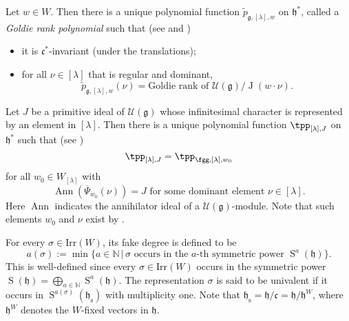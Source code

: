 \documentclass[12pt,a4paper]{amsart}
\newcommand{\BN}{{\mathbb {N}}}
\newcommand{\CU}{{\mathcal {U}}}
\DeclareMathOperator{\Ann}{Ann}
\newcommand{\oJ}{\operatorname{J}}
\newcommand{\oS}{\operatorname{S}}
\newcommand{\g}{\mathfrak g}
\newcommand{\h}{\mathfrak h}
\renewcommand{\c}{\mathfrak c}
\newcommand{\be}{\begin {equation}}
\newcommand{\ee}{\end {equation}}
\numberwithin{equation}{section}
\theoremstyle{remark}
\def\Irr{\mathrm{Irr}}
\newcommand{\Lam}{{[\lambda]}}
\begin{document}
Let $w\in W$. %
Then there is a unique
polynomial function $\tilde p_{\g,\Lam,w}$ on $\h^*$, called a \emph{Goldie rank polynomial} such that (see \cite[Section 5.12]{J1} and \cite[Section 2.10]{J.av})
\begin{itemize}
\item it is $\c^*$-invariant (under the translations);
\item for all $\nu\in \Lam$ that is regular and dominant,
\[
 \tilde p_{\g,\Lam,w}(\nu)=\textrm{Goldie rank of } \CU(\g)/\oJ(w \cdot\nu).
\]

\end{itemize}


Let $J$ be a primitive ideal of $\CU(\g)$ whose infinitesimal character is represented by an element in $\Lam$.
Then there is a unique polynomial function $ \tpp_{\Lam, J}$ on $\h^*$ such that (see \cite[Section 5.12]{J1})
\[
  \tpp_{\Lam, J}= \tpp_{\fgg,\Lam,w_0}
\]
for all $w_0\in W_\Lam$ with
\be\label{idealj}
\Ann(\overline \Psi_{w_0}(\nu))=J
\textrm{ for some dominant element $\nu\in \Lam$.}
\ee
 Here $\Ann$ indicates the annihilator ideal of a $\CU(\g)$-module.
Note that such elements $w_0$ and $\nu$ exist by  \cite[Theorem 1]{Du77}.


For every $\sigma\in \Irr(W)$, its fake degree is defined to be
 \begin{equation}\label{eq:fdeg}
 a(\sigma):=\min\{a\in \BN\,|\, \sigma \textrm{ occurs in the $a$-th symmetric power $\oS^a(\h)$}\}.
 \end{equation}
This is well-defined since every  $\sigma\in \Irr(W)$ occurs in the symmetric power $\oS(\h)=\bigoplus_{a\in \BN}\oS^a(\h)$. The representation $\sigma$ is said to be univalent if it occurs in $\oS^{a(\sigma)}(\h_{\mathrm s})$ with multiplicity one. Note that $\h_{\mathrm s}=\h/\c=\h/\h^W$, where $\h^W$ denotes the $W$-fixed vectors in $\h$.
\end{document}
